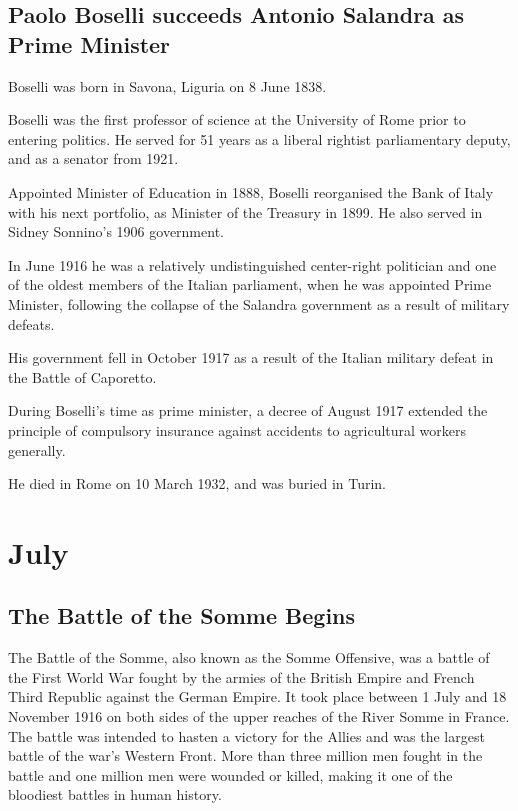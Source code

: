 \documentclass[a4paper,]{book}
\begin{document}
\section{Paolo Boselli succeeds Antonio Salandra as Prime Minister}

Boselli was born in Savona, Liguria on 8 June 1838.

Boselli was the first professor of science at the University of Rome prior to entering politics. He served for 51 years as a liberal rightist parliamentary deputy, and as a senator from 1921.

Appointed Minister of Education in 1888, Boselli reorganised the Bank of Italy with his next portfolio, as Minister of the Treasury in 1899. He also served in Sidney Sonnino's 1906 government.

In June 1916 he was a relatively undistinguished center-right politician and one of the oldest members of the Italian parliament, when he was appointed Prime Minister, following the collapse of the Salandra government as a result of military defeats.

His government fell in October 1917 as a result of the Italian military defeat in the Battle of Caporetto.

During Boselli's time as prime minister, a decree of August 1917 extended the principle of compulsory insurance against accidents to agricultural workers generally.

He died in Rome on 10 March 1932, and was buried in Turin. 


\chapter{July}

\section{The Battle of the Somme Begins}

The Battle of the Somme, also known as the Somme Offensive, was a battle of the First World War fought by the armies of the British Empire and French Third Republic against the German Empire. It took place between 1 July and 18 November 1916 on both sides of the upper reaches of the River Somme in France. The battle was intended to hasten a victory for the Allies and was the largest battle of the war's Western Front. More than three million men fought in the battle and one million men were wounded or killed, making it one of the bloodiest battles in human history.
\end{document}
